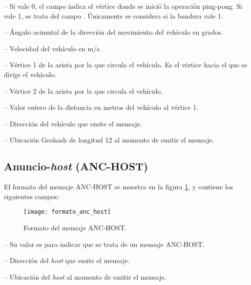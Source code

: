  -- Si vale 0, el campo  indica el
vértice donde se inició la operación ping-pong. Si vale 1, se trata del campo
. Únicamente se considera si la bandera  vale 1.

 -- Ángulo acimutal de la dirección del movimiento
del vehículo en grados.

 -- Velocidad del vehículo en m/s.

 -- Vértice 1 de la arista por la que
circula el vehículo. Es el vértice hacia el que se dirige el vehículo.

 -- Vértice 2 de la arista por la que
circula el vehículo.

 -- Valor entero de la distancia en metros del
vehículo al vértice 1.

 -- Dirección del vehículo que emite el
mensaje.

 -- Ubicación Geohash de longitud 12 al
momento de emitir el mensaje.

\subsection{Anuncio-\textit{host} (ANC-HOST)}

\label{subsec:mensaje_anuncio_host}

El formato del mensaje ANC-HOST se muestra en la figura
\ref{fig:formato_anc_host}, y contiene los siguientes campos:

\begin{figure}[th!]
\centering
\texttt{[image: formato\_anc\_host]}
\decoRule
\caption[Formato del mensaje ANC-HOST]{Formato del mensaje ANC-HOST.}
\label{fig:formato_anc_host}
\end{figure}

 -- Su valor es  para indicar que se trata de un
mensaje ANC-HOST.

 -- Dirección del \textit{host} que emite el
mensaje.

 -- Ubicación del \textit{host} al momento
de emitir el mensaje.

